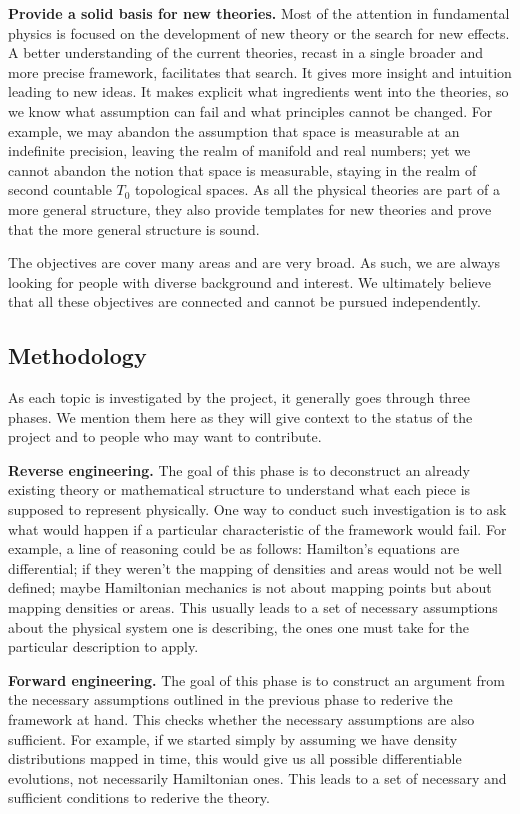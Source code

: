 \documentclass[twocolumn]{article}
\begin{document}
\textbf{Provide a solid basis for new theories.} Most of the attention in fundamental physics is focused on the development of new theory or the search for new effects. A better understanding of the current theories, recast in a single broader and more precise framework, facilitates that search. It gives more insight and intuition leading to new ideas. It makes explicit what ingredients went into the theories, so we know what assumption can fail and what principles cannot be changed. For example, we may abandon the assumption that space is measurable at an indefinite precision, leaving the realm of manifold and real numbers; yet we cannot abandon the notion that space is measurable, staying in the realm of second countable $T_0$ topological spaces. As all the physical theories are part of a more general structure, they also provide templates for new theories and prove that the more general structure is sound.

The objectives are cover many areas and are very broad. As such, we are always looking for people with diverse background and interest. We ultimately believe that all these objectives are connected and cannot be pursued independently.

\subsection{Methodology}

As each topic is investigated by the project, it generally goes through three phases. We mention them here as they will give context to the status of the project and to people who may want to contribute.

\textbf{Reverse engineering.} The goal of this phase is to deconstruct an already existing theory or mathematical structure to understand what each piece is supposed to represent physically. One way to conduct such investigation is to ask what would happen if a particular characteristic of the framework would fail. For example, a line of reasoning could be as follows: Hamilton's equations are differential; if they weren't the mapping of densities and areas would not be well defined; maybe Hamiltonian mechanics is not about mapping points but about mapping densities or areas. This usually leads to a set of necessary assumptions about the physical system one is describing, the ones one must take for the particular description to apply.

\textbf{Forward engineering.} The goal of this phase is to construct an argument from the necessary assumptions outlined in the previous phase to rederive the framework at hand. This checks whether the necessary assumptions are also sufficient. For example, if we started simply by assuming we have density distributions mapped in time, this would give us all possible differentiable evolutions, not necessarily Hamiltonian ones. This leads to a set of necessary and sufficient conditions to rederive the theory.
\end{document}
